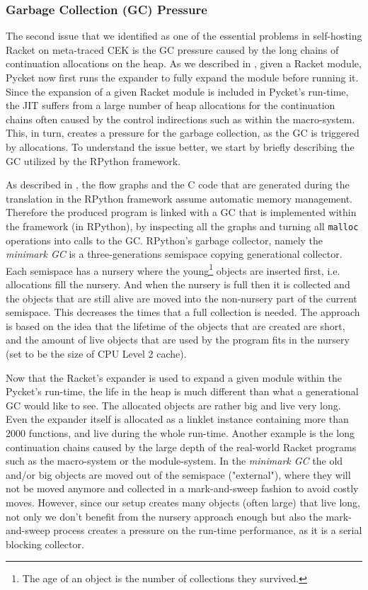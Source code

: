\vspace{-0.25cm}

\subsubsection{Garbage Collection (GC) Pressure}

The second issue that we identified as one of the essential problems
in self-hosting Racket on meta-traced CEK is the GC pressure caused by
the long chains of continuation allocations on the heap. As we
described in , given a Racket module, Pycket now
first runs the expander to fully expand the module before running
it. Since the expansion of a given Racket module is included in
Pycket's run-time, the JIT suffers from a large number of heap
allocations for the continuation chains often caused by the control
indirections such as within the macro-system. This, in turn, creates a
pressure for the garbage collection, as the GC is triggered by
allocations. To understand the issue better, we start by briefly
describing the GC utilized by the RPython framework.

As described in , the flow graphs and the C
code that are generated during the translation in the RPython
framework assume automatic memory management. Therefore the produced
program is linked with a GC that is implemented within the framework
(in RPython), by inspecting all the graphs and turning all
\texttt{malloc} operations into calls to the GC. RPython's garbage
collector, namely the \emph{minimark GC} is a three-generations
semispace copying generational collector. Each semispace has a nursery
where the young\footnote{The age of an object is the number of
  collections they survived.}  objects are inserted first,
i.e. allocations fill the nursery. And when the nursery is full then
it is collected and the objects that are still alive are moved into
the non-nursery part of the current semispace. This decreases the
times that a full collection is needed. The approach is based on the
idea that the lifetime of the objects that are created are short, and
the amount of live objects that are used by the program fits in the
nursery (set to be the size of CPU Level 2 cache). \cite{pypy06,
  bolz:14, gc:16, gc:12}

Now that the Racket's expander is used to expand a given module within
the Pycket's run-time, the life in the heap is much different than
what a generational GC would like to see. The allocated objects are
rather big and live very long. Even the expander itself is allocated
as a linklet instance containing more than 2000 functions, and live
during the whole run-time. Another example is the long continuation
chains caused by the large depth of the real-world Racket programs
such as the macro-system or the module-system. In the \emph{minimark
  GC} the old and/or big objects are moved out of the semispace
("external"), where they will not be moved anymore and collected in a
mark-and-sweep fashion to avoid costly moves. However, since our setup
creates many objects (often large) that live long, not only we don't
benefit from the nursery approach enough but also the mark-and-sweep
process creates a pressure on the run-time performance, as it is a
serial blocking collector.

